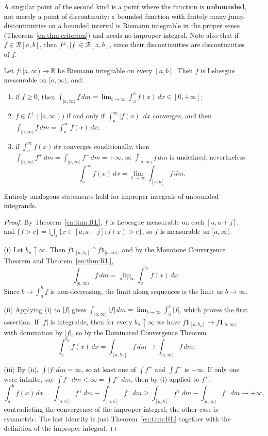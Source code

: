 \documentclass[11pt]{article}
\makeatletter
\newcommand{\envlabel}[1]{\protected@edef\@currentlabel{\themathenv}\label{#1}}
\makeatother
\begin{document}
A singular point of the second kind is a point where the function is \textbf{unbounded}, not merely a point of discontinuity: a bounded function with finitely many jump discontinuities on a bounded interval is Riemann integrable in the proper sense (Theorem~\ref{en:thm:criterion}) and needs no improper integral. Note also that if $f\in\mathcal{R}[a,b]$, then $f^{\pm},|f|\in\mathcal{R}[a,b]$, since their discontinuities are discontinuities of $f$.

\begin{theorem}\envlabel{en:thm:improper}
Let $f:[a,\infty)\to\mathbb{R}$ be Riemann integrable on every $[a,b]$. Then $f$ is Lebesgue measurable on $[a,\infty)$, and:
\begin{enumerate}
  \item if $f\geq0$, then $\displaystyle\int_{[a,\infty)}f\,dm=\lim_{b\to\infty}\int_{a}^{b}f(x)\,dx\in[0,+\infty]$;
  \item $f\in L^{1}([a,\infty))$ if and only if $\int_{a}^{\infty}|f(x)|\,dx$ converges, and then $\displaystyle\int_{[a,\infty)}f\,dm=\int_{a}^{\infty}f(x)\,dx$;
  \item if $\int_{a}^{\infty}f(x)\,dx$ converges conditionally, then $\int_{[a,\infty)}f^{+}\,dm=\int_{[a,\infty)}f^{-}\,dm=+\infty$, so $\int_{[a,\infty)}f\,dm$ is undefined; nevertheless
  \[
  \int_{a}^{\infty}f(x)\,dx=\lim_{b\to\infty}\int_{[a,b]}f\,dm.
  \]
\end{enumerate}
Entirely analogous statements hold for improper integrals of unbounded integrands.
\end{theorem}

\begin{proof}
By Theorem~\ref{en:thm:RL}, $f$ is Lebesgue measurable on each $[a,a+j]$, and $\{f>c\}=\bigcup_{j}\{x\in[a,a+j]:f(x)>c\}$, so $f$ is measurable on $[a,\infty)$.

(i) Let $b_{n}\uparrow\infty$. Then $f\mathbf{1}_{[a,b_{n}]}\uparrow f\mathbf{1}_{[a,\infty)}$, and by the Monotone Convergence Theorem and Theorem~\ref{en:thm:RL},
\[
\int_{[a,\infty)}f\,dm=\lim_{n\to\infty}\int_{a}^{b_{n}}f(x)\,dx.
\]
Since $b\mapsto\int_{a}^{b}f$ is non-decreasing, the limit along sequences is the limit as $b\to\infty$.

(ii) Applying (i) to $|f|$ gives $\int_{[a,\infty)}|f|\,dm=\lim_{b\to\infty}\int_{a}^{b}|f|$, which proves the first assertion. If $|f|$ is integrable, then for every $b_{n}\uparrow\infty$ we have $f\mathbf{1}_{[a,b_{n}]}\to f\mathbf{1}_{[a,\infty)}$ with domination by $|f|$, so by the Dominated Convergence Theorem
\[
\int_{a}^{b_{n}}f(x)\,dx=\int_{[a,b_{n}]}f\,dm\to\int_{[a,\infty)}f\,dm.
\]

(iii) By (ii), $\int|f|\,dm=\infty$, so at least one of $\int f^{+}$ and $\int f^{-}$ is $+\infty$. If only one were infinite, say $\int f^{-}\,dm<\infty=\int f^{+}\,dm$, then by (i) applied to $f^{+}$,
\[
\int_{a}^{b}f(x)\,dx=\int_{[a,b]}f^{+}\,dm-\int_{[a,b]}f^{-}\,dm\geq\int_{[a,b]}f^{+}\,dm-\int_{[a,\infty)}f^{-}\,dm\to+\infty,
\]
contradicting the convergence of the improper integral; the other case is symmetric. The last identity is just Theorem~\ref{en:thm:RL} together with the definition of the improper integral.
\end{proof}
\end{document}
